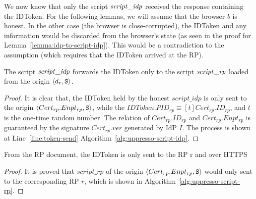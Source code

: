   We now know that only the script $\mathit{script\_idp}$ received 
  the response containing the IDToken. For the following lemmas, 
  we will assume that the browser $b$ is honest. In the other 
  case (the browser is close-corrupted), the IDToken and any 
  information would be discarded from the browser's state 
  (as seen in the proof for Lemma~\ref{lemma:idp-to-script-idp}). 
  This would be a contradiction to the assumption 
  (which requires that the IDToken arrived at the RP).
  
  
  \begin{lemma} %
    The script $\mathit{script\_idp}$ forwards the IDToken only to 
    the script $\mathit{script\_rp}$ loaded from the origin 
    $\langle d_r, \mathtt{S}\rangle$.
  \end{lemma}
  \begin{proof}
    It is clear that, the IDToken held by the honest 
    $script\_idp$ is only sent to the origin 
    $\langle Cert_{rp}.Enpt_{rp}, \mathtt{S}\rangle$, 
    while the $IDToken.PID_{rp} \equiv [t]Cert_{rp}.ID_{rp}$, 
    and $t$ is the one-time random number. The relation of 
    $Cert_{rp}.ID_{rp}$ and $Cert_{rp}.Enpt_{rp}$ is guaranteed 
    by the signature $Cert_{rp}.ver$ generated by IdP $I$. 
    The process is shown at Line~\ref{line:token-send}
    Algorithm~\ref{alg:uppresso-script-idp}.
  \end{proof}
  
  \begin{lemma} %
    From the RP document, the IDToken is only sent to the RP r 
    and over HTTPS
  \end{lemma}
  \begin{proof}
    It is proved that $script\_rp$ of the origin 
    $\langle Cert_{rp}.Enpt_{rp}, \mathtt{S}\rangle$ 
    would only sent to the corresponding RP $r$, 
    which is shown in Algorithm~\ref{alg:uppresso-script-rp}.
  \end{proof}
  
